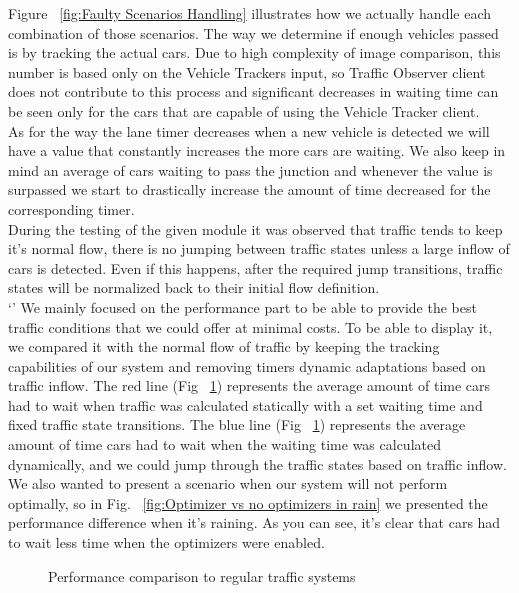 \documentclass[17pt]{report}
\begin{document}
\indent
Figure ~\ref{fig:Faulty Scenarios Handling} illustrates how 
we actually handle each combination of those scenarios. The way we determine if enough vehicles passed is by 
tracking the actual cars. Due to high complexity of image 
comparison, this number is based only on the Vehicle Trackers 
input, so Traffic Observer client does not contribute to this process 
and significant decreases in waiting time can be seen only for the 
cars that are capable of using the Vehicle Tracker client.\\
\indent
As for the way the lane timer decreases when a new vehicle is
detected we will have a value that constantly increases the more cars 
are waiting. We also keep in mind an average of cars 
waiting to pass the junction and whenever the value is surpassed 
we start to drastically increase the amount of time decreased 
for the corresponding timer.\\
\indent
During the testing of the given module it was observed that traffic tends to keep it's 
normal flow, there is no jumping between traffic states unless a large inflow of cars is 
detected. Even if this happens, after the required jump transitions, traffic states will 
be normalized back to their initial flow definition. \\
\indent`'
We mainly focused on the performance part to be able to provide
the best traffic conditions that we could offer at minimal costs.
To be able to display it, we compared it with the normal 
flow of traffic by keeping the tracking capabilities of our system 
and removing timers dynamic adaptations based on traffic inflow. 
The red line (Fig ~\ref{fig:Optimizer vs no optimizers}) represents the 
average amount of time cars had to wait when traffic was 
calculated statically with a set waiting time and fixed traffic state 
transitions. The blue line (Fig ~\ref{fig:Optimizer vs no optimizers}) 
represents the average amount of time cars had to wait when the 
waiting time was calculated dynamically, and we could jump through 
the traffic states based on traffic inflow. We also wanted to present a 
scenario when our system will not perform optimally, so in Fig. 
~\ref{fig:Optimizer vs no optimizers in rain} we presented 
the performance difference when it's raining. As you can see,
it's clear that cars had to wait less time when the optimizers
were enabled. \\
\begin{figure}[h!]
    \centering
    \label{fig:Optimizer vs no optimizers}
    \caption{Performance comparison to regular traffic systems}
\end{figure}
\end{document}
